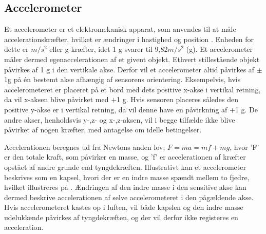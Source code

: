 \subsection{Accelerometer}
Et accelerometer er et elektromekanisk apparat, som anvendes til at måle accelerationskræfter, hvilket er ændringer i hastighed og position \citep{Goodrich2013,TittertonWeston2004}. Enheden for dette er $m/s^2$ eller g-kræfter, idet 1 g svarer til 9,82$m/s^2$ (g). Et accelerometer måler dermed egenaccelerationen af et givent objekt. \citep{Sparkfun,TittertonWeston2004} \newline
Ethvert stillestående objekt påvirkes af 1 g i den vertikale akse\citep{Serway2010}. Derfor vil et accelerometer altid påvirkes af $\pm$1g på én bestemt akse afhængig af sensorens orientering. Eksempelvis, hvis accelerometeret er placeret på et bord med dets positive x-akse i vertikal retning, da vil x-aksen blive påvirket med $+$1 g. Hvis sensoren placeres således den positive y-akse er i vertikal retning, da vil denne have en påvirkning af $+$1 g. De andre akser, henholdsvis y-,z- og x-,z-aksen, vil i begge tilfælde ikke blive påvirket af nogen kræfter, med antagelse om idelle betingelser. 

Accelerationen beregnes ud fra Newtons anden lov; $F=ma=mf+mg$, hvor 'F' er den totale kraft, som påvirker en masse, og 'f' er accelerationen af kræfter opstået af andre grunde end tyngdekræften.\citep{TittertonWeston2004,Academic2016d} \newline
Illustrativt kan et accelerometer beskrives som en kapsel, hvori der er en indre masse spændt mellem to fjedre, hvilket illustreres på . Ændringen af den indre masse i den sensitive akse kan dermed beskrive accelerationen af selve accelerometeret i den pågældende akse. Hvis accelerometeret kastes op i luften, vil både kapslen og den indre masse udelukkende påvirkes af tyngdekræften, og der vil derfor ikke registeres en acceleration.\citep{TittertonWeston2004,Academic2016d} \newline

